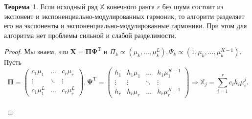 \documentclass[specialist, substylefile = spbureport.rtx, subf,href,colorlinks=true, 12pt]{disser}
\theoremstyle{definition}
\newtheorem{theorem}{Теорема}
\begin{document}
\begin{theorem}
Если исходный ряд $\mathbb{X}$ конечного ранга $r$ без шума состоит из экспонент и экспоненциально-модулированных гармоник, то алгоритм разделяет его на экспоненты и экспоненциально-модулированные гармоники. При этом для алгоритма нет проблемы сильной и слабой разделимости.
\end{theorem}
\begin{proof}
Мы знаем, что $\mathbf{X} = \mathbf{\Pi\Psi}^{\mathrm{T}}$ и $\Pi_k \propto (\mu_k, \dots ,\mu^L_k), \Psi_k \propto (1, \mu_k, \dots ,\mu^{K-1}_k)$. Пусть 
\begin{equation*}\
    \mathbf{\Pi} = \begin{pmatrix}
        c_1\mu_1 & \dots & c_r\mu_r \\
        \vdots & \ddots & \vdots \\
        c_1\mu_1^L & \dots & c_r\mu_r^L
    \end{pmatrix}, \mathbf{\Psi}^{\mathrm{T}} =
    \begin{pmatrix}
        h_1 & h_1\mu_1 & \dots & h_1\mu_1^{K - 1} \\
        \vdots & \vdots & \ddots & \vdots \\
        h_r & h_r\mu_r & \dots & h_r\mu_r^{K - 1}
    \end{pmatrix} \Rightarrow  \mathbb{X}_j = \sum_{i = 1}^{r}c_i h_i \mu_i^j.
\end{equation*} \\



\end{proof}
\end{document}
